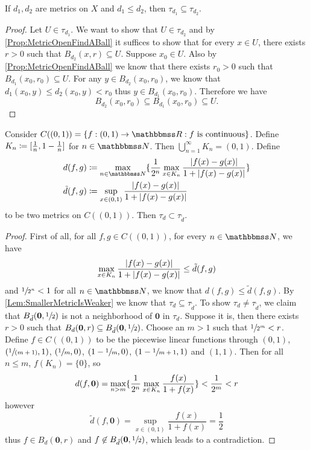 \documentclass[screen,single]{techreport}
\numberwithin{equation}{section}
\begin{document}
\begin{lemma}\label{Lem:SmallerMetricIsWeaker}
	If $d_1,d_2$ are metrics on $X$ and $d_1 \le d_2$, then $\tau_{d_1} \subseteq \tau_{d_2}$.
\end{lemma}
\begin{proof}
	Let $U \in \tau_{d_1}$.
	We want to show that $U \in \tau_{d_2}$ and by \cref{Prop:MetricOpenFindABall} it suffices to show that for every $x \in U$, there exists $r >0$ such that $B_{d_2}(x,r) \subseteq U$.
	Suppose $x_0 \in U$.
	Also by \cref{Prop:MetricOpenFindABall} we know that there exists $r_0 > 0$ such that $B_{d_1}(x_0,r_0) \subseteq U$.
	For any $y \in B_{d_2}(x_0,r_0)$, we know that $d_1(x_0,y) \le d_2(x_0,y) < r_0$ thus $y \in B_{d_1}(x_0,r_0)$.
	Therefore we have
	\[
	B_{d_2}(x_0,r_0) \subseteq B_{d_1}(x_0,r_0) \subseteq U.
	\]
\end{proof}

\begin{proposition}\label{Prop:SmallerMetricIndeedWeaker}
	Consider $C((0,1)) = \{ f : (0,1) \to \bbR : f~\text{is continuous} \}$.
	Define $K_n \coloneqq [{\frac{1}{n}, 1-\frac{1}{n}}]$ for $n \in \bbN$.
	Then $\bigcup_{n=1}^\infty K_n = (0,1)$.
	Define
	\begin{align*}
		d(f,g) & \coloneqq \max_{n \in \bbN} \set{ \frac{1}{2^n} \max_{x \in K_n} \frac{\abs{f(x)-g(x)}}{1+\abs{f(x)-g(x)}} } \\
		\tilde{d}(f,g) & \coloneqq  \sup_{x \in (0,1)} \frac{\abs{f(x)-g(x)}}{1+\abs{f(x)-g(x)}}
	\end{align*}
	to be two metrics on $C((0,1))$.
	Then $\tau_d \subset \tau_{\tilde{d}}$.
\end{proposition}
\begin{proof}
	First of all, for all $f,g \in C((0,1))$, for every $n \in \bbN$, we have
	\[
	\max_{x \in K_n} \frac{|{f(x)-g(x)}|}{1+|{f(x)-g(x)}|} \le \tilde{d}(f,g)
	\]
	and $\sfrac{1}{2^n} < 1$ for all $n \in \bbN$, we know that $d(f,g) \le \tilde{d}(f,g)$.
	By \cref{Lem:SmallerMetricIsWeaker} we know that $\tau_d \subseteq \tau_{\tilde{d}}$.
	To show $\tau_d \neq \tau_{\tilde{d}}$, we claim that $B_{\tilde{d}}(\mathbf{0},\sfrac{1}{2})$ is not a neighborhood of $\mathbf{0}$ in $\tau_d$.
	Suppose it is, then there exists $r > 0$ such that $B_d(\mathbf{0},r) \subseteq B_{\tilde{d}}(\mathbf{0},\sfrac{1}{2})$.
	Choose an $m >1$ such that $\sfrac{1}{2^m} < r$.
	Define $f \in C((0,1))$ to be the piecewise linear functions through $(0,1)$, $(\sfrac{1}{(m+1)},1)$, $(\sfrac{1}{m},0)$, $(1-\sfrac{1}{m},0)$, $(1-\sfrac{1}{m+1},1)$ and $(1,1)$.
	Then for all $n \le m$, $f(K_n) = \{0\}$, so
	\[
	d(f,\mathbf{0})  = \max_{n > m} \{ { \frac{1}{2^n} \max_{x \in K_n} \frac{f(x)}{1+f(x)}  } \} < \frac{1}{2^m} < r
	\]
	however
	\[
	\tilde{d}(f,\mathbf{0}) = \sup_{x \in (0,1)} \frac{f(x)}{1+f(x)} = \frac{1}{2}
	\]
	thus $f \in B_d(\mathbf{0},r)$ and $f \not\in B_{\tilde{d}}(\mathbf{0}, \sfrac{1}{2})$, which leads to a contradiction.
\end{proof}
\end{document}
